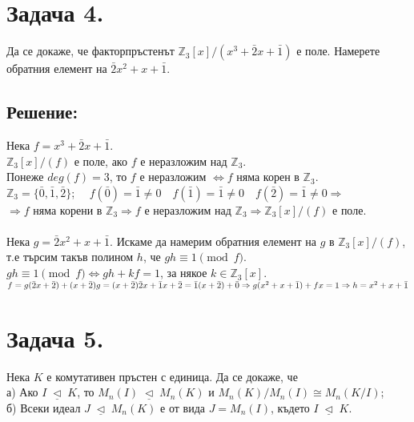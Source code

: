 \documentclass[10pt]{article}
\newcommand*{\Z}{\mathbb{Z}}
\newcommand{\triq}{\; \underline{\triangleleft} \;}
\begin{document}
\section*{Задача 4.}
Да се докаже, че факторпръстенът $\Z_3[x]/(x^3 + \bar{2}x + \bar{1})$ е поле. Намерете обратния елемент на $\bar{2}x^2 + x + \bar{1}$.
\subsection*{Решение:}
Нека $f = x^3 + \bar{2}x + \bar{1}$.\\
$\Z_3[x]/(f)$ е поле, ако $f$ е неразложим над $\Z_3$.\\
Понеже $deg(f) = 3$, то $f$ е неразложим $\Leftrightarrow f$ няма корен в $\Z_3$.\\
$\Z_3 = \{\bar{0}, \bar{1}, \bar{2}\}$;
$\quad f(\bar{0}) = \bar{1} \neq 0 \quad f(\bar{1}) = \bar{1} \neq 0 \quad f(\bar{2}) = \bar{1} \neq 0 \Rightarrow$\\
$\Rightarrow f$ няма корени в $\Z_3 \Rightarrow f$ е неразложим над $\Z_3 \Rightarrow \Z_3[x]/(f)$ е поле.\\\\
Нека $g = \bar{2}x^2 + x + \bar{1}$. Искаме да намерим обратния елемент на $g$ в $\Z_3[x]/(f)$, т.е търсим такъв полином $h$, че $gh \equiv 1 \pmod{f}$.\\
$gh \equiv 1 \pmod{f} \Leftrightarrow gh + kf = 1$, за някое $k \in \Z_3[x]$.\\
$f = g(\bar{2}x + \bar{2}) + (x + \bar{2})\\
g = (x + \bar{2})\bar{2}x + \bar{1}\\
x + \bar{2} = \bar{1}(x + \bar{2}) + \bar{0}\\
\Rightarrow g(x^2 + x + \bar{1}) + fx = 1\\
\Rightarrow h = x^2 + x + \bar{1}$
\newpage

\section*{Задача 5.}
Нека $K$ е комутативен пръстен с единица. Да се докаже, че\\
а) Ако $I \triq K$, то $M_n(I) \triq M_n(K)$ и $M_n(K)/M_n(I) \cong M_n(K/I)$;\\
б) Всеки идеал $J \triq M_n(K)$ е от вида $J = M_n(I)$, където $I \triq K$.
\end{document}

